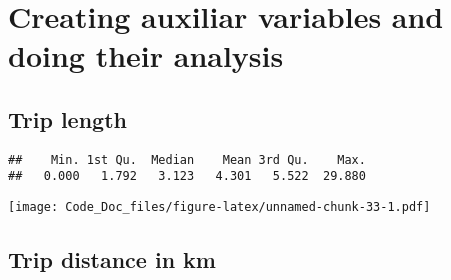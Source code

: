 \documentclass[]{article}
\newenvironment{Shaded}{\begin{snugshade}}{\end{snugshade}}
\newcommand{\KeywordTok}[1]{\textcolor[rgb]{0.13,0.29,0.53}{\textbf{{#1}}}}
\newcommand{\DecValTok}[1]{\textcolor[rgb]{0.00,0.00,0.81}{{#1}}}
\newcommand{\FloatTok}[1]{\textcolor[rgb]{0.00,0.00,0.81}{{#1}}}
\newcommand{\CommentTok}[1]{\textcolor[rgb]{0.56,0.35,0.01}{\textit{{#1}}}}
\newcommand{\NormalTok}[1]{{#1}}
\begin{document}
\section{Creating auxiliar variables and doing their
analysis}\label{creating-auxiliar-variables-and-doing-their-analysis}

\subsection{Trip length}\label{trip-length}

\begin{Shaded}
\end{Shaded}

\begin{verbatim}
##    Min. 1st Qu.  Median    Mean 3rd Qu.    Max. 
##   0.000   1.792   3.123   4.301   5.522  29.880
\end{verbatim}

\begin{Shaded}
\end{Shaded}

\texttt{[image: Code\_Doc\_files/figure-latex/unnamed-chunk-33-1.pdf]}

\subsection{Trip distance in km}\label{trip-distance-in-km}

\begin{Shaded}
\end{Shaded}
\end{document}
